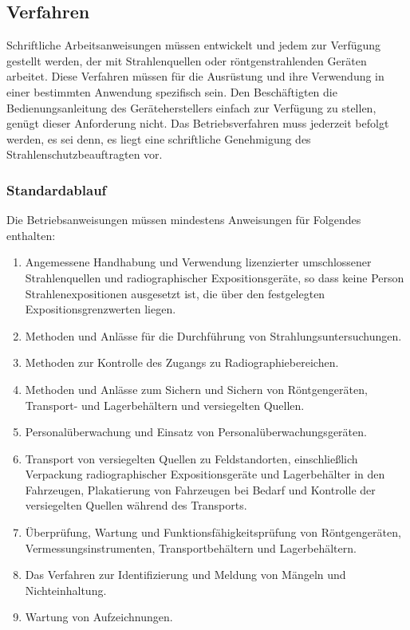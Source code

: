 {\subsection{Verfahren}
Schriftliche Arbeitsanweisungen müssen entwickelt und jedem zur Verfügung gestellt werden, der mit Strahlenquellen oder röntgenstrahlenden Geräten arbeitet. Diese Verfahren müssen für die Ausrüstung und ihre Verwendung in einer bestimmten Anwendung spezifisch sein. Den Beschäftigten die Bedienungsanleitung des Geräteherstellers einfach zur Verfügung zu stellen, genügt dieser Anforderung nicht. Das Betriebsverfahren muss jederzeit befolgt werden, es sei denn, es liegt eine schriftliche Genehmigung des Strahlenschutzbeauftragten vor.
\subsubsection{Standardablauf}
Die Betriebsanweisungen müssen mindestens Anweisungen für Folgendes enthalten:
\begin{enumerate}
\item Angemessene Handhabung und Verwendung lizenzierter umschlossener Strahlenquellen und radiographischer Expositionsgeräte, so dass keine Person Strahlenexpositionen ausgesetzt ist, die über den festgelegten Expositionsgrenzwerten liegen.
\item Methoden und Anlässe für die Durchführung von Strahlungsuntersuchungen.
\item Methoden zur Kontrolle des Zugangs zu Radiographiebereichen.
\item Methoden und Anlässe zum Sichern und Sichern von Röntgengeräten, Transport- und Lagerbehältern und versiegelten Quellen.
\item Personalüberwachung und Einsatz von Personalüberwachungsgeräten.
\item Transport von versiegelten Quellen zu Feldstandorten, einschließlich Verpackung radiographischer Expositionsgeräte und Lagerbehälter in den Fahrzeugen, Plakatierung von Fahrzeugen bei Bedarf und Kontrolle der versiegelten Quellen während des Transports.
\item Überprüfung, Wartung und Funktionsfähigkeitsprüfung von Röntgengeräten, Vermessungsinstrumenten, Transportbehältern und Lagerbehältern.
\item Das Verfahren zur Identifizierung und Meldung von Mängeln und Nichteinhaltung.
\item Wartung von Aufzeichnungen.

\end{enumerate}

}
